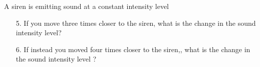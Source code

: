 \documentclass{article}
\begin{document}
\vskip 0.75pt

A siren is emitting sound at a constant intensity level

\begin{enumerate}

  \item[5.] If you move three times closer to the siren, what is the change in the sound intensity level?

            \ifsolutions

            \else
            \vskip 96pt
            \fi

  \item[6.] If instead you moved four times closer to the siren,, what is the change in the sound intensity level ?

            \ifsolutions

            \else
            \vskip 96pt
            \fi

\end{enumerate}

\vskip 0.75pt
\end{document}
